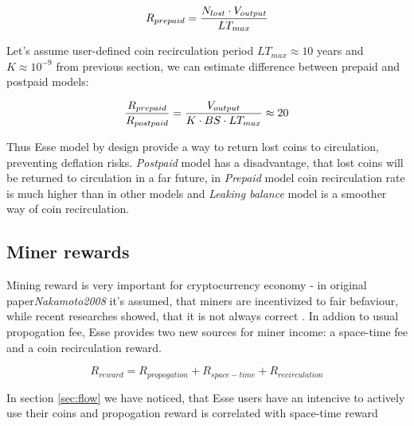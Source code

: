 \documentclass[]{article}   %
\newcommand{\authnote}[2]{\marginpar{\parbox{\marginparwidth}{\tiny %
  \textsf{#1 {\textcolor{blue}{notes: #2}}}}}%
  \textcolor{blue}{\textbf{\dag}}}
\newcommand{\authnote}[2]{
  \textsf{#1 \textcolor{blue}{: #2}}}
\newcommand{\authnote}[2]{}
\newcommand{\dnote}[1]{{\authnote{\textcolor{blue}{Dima notes}}{#1}}}
\newcommand{\esse}{Esse}
\begin{document}
\begin{equation}
R_{prepaid} = {N_{lost} \cdot V_{output} \over LT_{max}}
\end{equation}

Let's assume user-defined coin recirculation period $LT_{max}\approx10$ years and $K\approx10^{-9}$ from previous section, we can estimate difference between prepaid and postpaid models:

\begin{equation}
{R_{prepaid} \over R_{postpaid}} = { V_{output}  \over  K \cdot BS \cdot LT_{max}} \approx 20
\end{equation}


 \dnote{Check, should be something like 1000}

Thus \esse{} model by design provide a way to return lost coins to circulation, preventing deflation risks. \textit{Postpaid} model has a disadvantage, that lost coins will be returned to circulation in a far future, in \textit{Prepaid} model coin recirculation rate is much higher than in other models and \textit{Leaking balance} model is a smoother way of coin recirculation.

\subsection{Miner rewards}

Mining reward is very important for cryptocurrency economy - in original paper\textit{Nakamoto2008} it's assumed, that miners are incentivized to fair befaviour, while recent researches showed, that it is not always correct \cite{carlsten2016instability, Eyal2014}. In addion to usual propogation fee, \esse{} provides two new sources for miner income: a space-time fee and a coin recirculation reward.

\begin{equation}
R_{reward} = R_{propogation} + R_{space-time} + R_{recirculation}
\end{equation}

In section \ref{sec:flow} we have noticed, that \esse{} users have an intencive to actively use their coins and propogation reward is correlated with space-time reward
\end{document}
